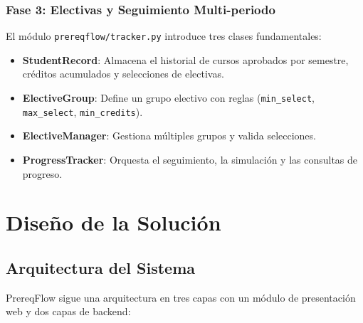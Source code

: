 \documentclass[12pt]{report}
\begin{document}
\subsection{Fase 3: Electivas y Seguimiento Multi-periodo}
El módulo \texttt{prereqflow/tracker.py} introduce tres clases fundamentales:
\begin{itemize}
    \item \textbf{StudentRecord}: Almacena el historial de cursos aprobados por semestre, créditos acumulados y selecciones de electivas.
    \item \textbf{ElectiveGroup}: Define un grupo electivo con reglas (\texttt{min\_select}, \texttt{max\_select}, \texttt{min\_credits}).
    \item \textbf{ElectiveManager}: Gestiona múltiples grupos y valida selecciones.
    \item \textbf{ProgressTracker}: Orquesta el seguimiento, la simulación y las consultas de progreso.
\end{itemize}

\chapter{Diseño de la Solución}

\section{Arquitectura del Sistema}

PrereqFlow sigue una arquitectura en tres capas con un módulo de presentación web y dos capas de backend:
\end{document}
